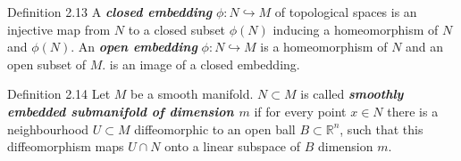 \begin{thing3}{Definition 2.13}\leavevmode
A \textit{\textbf{closed embedding}} $\phi:N \hookrightarrow M$ of topological spaces is an injective map from $N$ to a closed subset $\phi(N)$ inducing a homeomorphism of $N$ and $\phi(N)$. An \textit{\textbf{open embedding}} $\phi:N \hookrightarrow M$ is a homeomorphism of $N$ and an open subset of $M$. is an image of a closed embedding.
\end{thing3}

\begin{thing3}{Definition 2.14}\leavevmode
Let $M$ be a smooth manifold. $N \subset M$ is called \textit{\textbf{smoothly embedded submanifold of dimension $m$}} if for every point $x \in N$ there is a neighbourhood $U \subset M$ diffeomorphic to an open ball $B \subset \mathbb{R}^n$, such that this diffeomorphism maps $ U \cap N$ onto a linear subspace of $B$ dimension $m$.
\end{thing3}

